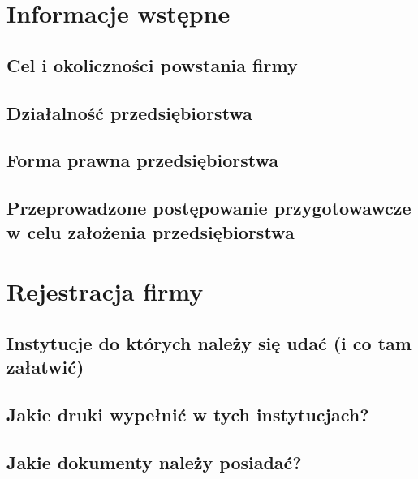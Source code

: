 \documentclass{sprawozdanie-agh}
\begin{document}
   


	\stronatytulowa{}

	\section{Informacje wstępne}

		\subsection{Cel i okoliczności powstania firmy}



		\subsection{Działalność przedsiębiorstwa}



		\subsection{Forma prawna przedsiębiorstwa}



		\subsection{Przeprowadzone postępowanie przygotowawcze w celu założenia przedsiębiorstwa}



	\section{Rejestracja firmy}

		\subsection{Instytucje do których należy się udać (i co tam załatwić)}
		\subsection{Jakie druki wypełnić w tych instytucjach?}
		\subsection{Jakie dokumenty należy posiadać?}
\end{document}
